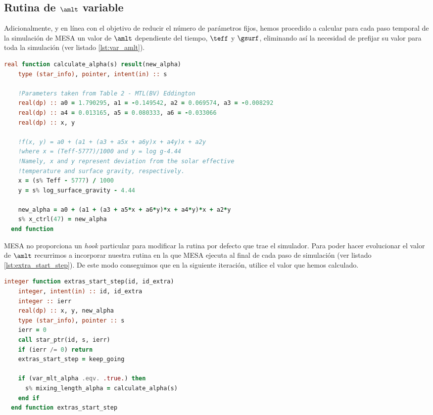 \subsection{Rutina de $\amlt$ variable}
Adicionalmente, y en línea con el objetivo de reducir el número de parámetros fijos, hemos procedido a calcular para cada paso temporal de la simulación de MESA un valor de $\amlt$ dependiente del tiempo, $\teff$ y $\gsurf$, eliminando así la necesidad de prefijar su valor para toda la simulación (ver listado \ref{lst:var_amlt}).\par  

\begin{lstlisting}[language=Fortran, float, caption={Rutina de $\amlt$ variable.}, label={lst:var_amlt}]
  real function calculate_alpha(s) result(new_alpha)
    type (star_info), pointer, intent(in) :: s
    
    !Parameters taken from Table 2 - MTL(BV) Eddington
    real(dp) :: a0 = 1.790295, a1 = -0.149542, a2 = 0.069574, a3 = -0.008292
    real(dp) :: a4 = 0.013165, a5 = 0.080333, a6 = -0.033066
    real(dp) :: x, y
    
    !f(x, y) = a0 + (a1 + (a3 + a5x + a6y)x + a4y)x + a2y
    !where x = (Teff-5777)/1000 and y = log g-4.44
    !Namely, x and y represent deviation from the solar effective 
    !temperature and surface gravity, respectively.
    x = (s% Teff - 5777) / 1000
    y = s% log_surface_gravity - 4.44
    
    new_alpha = a0 + (a1 + (a3 + a5*x + a6*y)*x + a4*y)*x + a2*y
    s% x_ctrl(47) = new_alpha
  end function
\end{lstlisting}

MESA no proporciona un \textit{hook} particular para modificar la rutina por defecto que trae el simulador. Para poder hacer evolucionar el valor de $\amlt$ recurrimos a incorporar nuestra rutina en la que MESA ejecuta al final de cada paso de simulación (ver listado \ref{lst:extra_start_step}). De este modo conseguimos que en la siguiente iteración, utilice el valor que hemos calculado.\par

\begin{lstlisting}[language=Fortran, float, caption={Rutina de MESA para ejecutar lógica adicional tras la ejecución de un paso de simulación.}, label={lst:extra_start_step}]
  integer function extras_start_step(id, id_extra)
    integer, intent(in) :: id, id_extra
    integer :: ierr
    real(dp) :: x, y, new_alpha
    type (star_info), pointer :: s
    ierr = 0
    call star_ptr(id, s, ierr)
    if (ierr /= 0) return
    extras_start_step = keep_going
    
    if (var_mlt_alpha .eqv. .true.) then
      s% mixing_length_alpha = calculate_alpha(s)
    end if
  end function extras_start_step
\end{lstlisting}

\endinput

